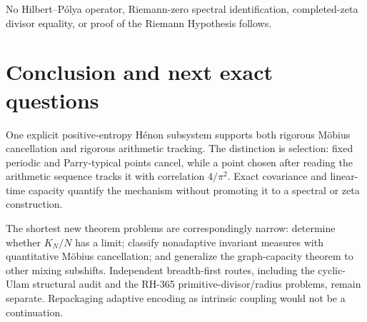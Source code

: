\documentclass[11pt,a4paper]{article}
\theoremstyle{remark}
\begin{document}
No Hilbert--P\'olya operator, Riemann-zero spectral identification,
completed-zeta divisor equality, or proof of the Riemann Hypothesis follows.

\section{Conclusion and next exact questions}

One explicit positive-entropy H\'enon subsystem supports both rigorous
M\"obius cancellation and rigorous arithmetic tracking.  The distinction is
selection: fixed periodic and Parry-typical points cancel, while a point
chosen after reading the arithmetic sequence tracks it with correlation
$4/\pi^2$.  Exact covariance and linear-time capacity quantify the mechanism
without promoting it to a spectral or zeta construction.

The shortest new theorem problems are correspondingly narrow: determine
whether $K_N/N$ has a limit; classify nonadaptive invariant measures with
quantitative M\"obius cancellation; and generalize the graph-capacity theorem
to other mixing subshifts.  Independent breadth-first routes, including the
cyclic-Ulam structural audit and the RH-365 primitive-divisor/radius problems,
remain separate.  Repackaging adaptive encoding as intrinsic coupling would
not be a continuation.



\end{document}
